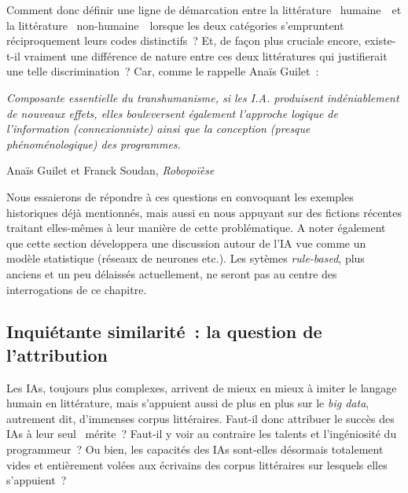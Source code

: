 \documentclass{article}
\newenvironment{citationbox}
{\begin{center}
		\begin{minipage}{.8\textwidth}
		}
		{
		\end{minipage}	
\end{center}
}
\begin{document}
		Comment donc définir une ligne de démarcation entre la littérature \guillemotleft~humaine~\guillemotright~et la littérature \guillemotleft~non-humaine~\guillemotright~lorsque les deux catégories s'empruntent réciproquement leurs codes distinctifs ? Et, de façon plus cruciale encore, existe-t-il vraiment une différence de nature entre ces deux littératures qui justifierait une telle discrimination ? Car, comme le rappelle Anaïs Guilet~:
		\begin{citationbox}
			\textit{Composante essentielle du transhumanisme, si les I.A. produisent indéniablement de nouveaux effets, elles bouleversent également l'approche logique de l'information (connexionniste) ainsi que la conception (presque phénoménologique) des programmes.}
			\begin{flushright}
				Anaïs Guilet et Franck Soudan, \textit{Robopoïèse} \autocite{guilet2017}
			\end{flushright}
		\end{citationbox}
		Nous essaierons de répondre à ces questions en convoquant les exemples historiques déjà mentionnés, mais aussi en nous appuyant sur des fictions récentes traitant elles-mêmes à leur manière de cette problématique. A noter également que cette section développera une discussion autour de l'IA vue comme un modèle statistique (réseaux de neurones etc.). Les sytèmes \textit{rule-based}, plus anciens et un peu délaissés actuellement, ne seront pas au centre des interrogations de ce chapitre.
		\subsection{Inquiétante similarité~: la question de l'attribution}
			Les IAs, toujours plus complexes, arrivent de mieux en mieux à imiter le langage humain en littérature, mais s'appuient aussi de plus en plus sur le \textit{big data}, autrement dit, d'immenses corpus littéraires. Faut-il donc attribuer le succès des IAs à leur seul \guillemotleft~mérite~\guillemotright? Faut-il y voir au contraire les talents et l'ingéniosité du programmeur~? Ou bien, les capacités des IAs sont-elles désormais totalement vides et entièrement volées aux écrivains des corpus littéraires sur lesquels elles s'appuient~?
\end{document}
